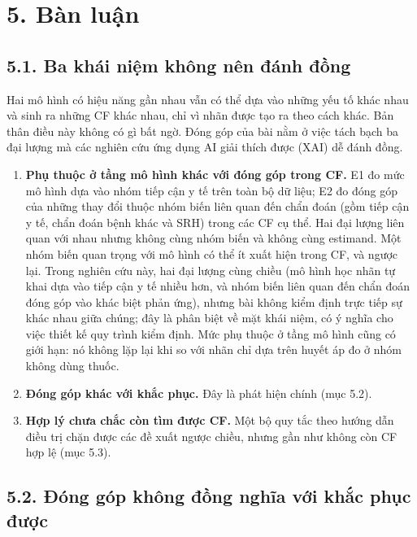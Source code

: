 \documentclass[9pt,a4paper]{extarticle}
\providecommand{\tightlist}{\setlength{\itemsep}{0pt}\setlength{\parskip}{0pt}}
\begin{document}
\section{5. Bàn luận}

\subsection{5.1. Ba khái niệm không nên đánh đồng}

Hai mô hình có hiệu năng gần nhau vẫn có thể dựa vào những yếu tố khác
nhau và sinh ra những CF khác nhau, chỉ vì nhãn được tạo ra theo cách
khác. Bản thân điều này không có gì bất ngờ. Đóng góp của bài nằm ở việc
tách bạch ba đại lượng mà các nghiên cứu ứng dụng AI giải thích được
(XAI) dễ đánh đồng.

\begin{enumerate}
\def\labelenumi{\arabic{enumi}.}
\tightlist
\item
  \textbf{Phụ thuộc ở tầng mô hình khác với đóng góp trong CF.} E1 đo
  mức mô hình dựa vào nhóm tiếp cận y tế trên toàn bộ dữ liệu; E2 đo
  đóng góp của những thay đổi thuộc nhóm biến liên quan đến chẩn đoán
  (gồm tiếp cận y tế, chẩn đoán bệnh khác và SRH) trong các CF cụ thể.
  Hai đại lượng liên quan với nhau nhưng không cùng nhóm biến và không
  cùng estimand. Một nhóm biến quan trọng với mô hình có thể ít xuất
  hiện trong CF, và ngược lại. Trong nghiên cứu này, hai đại lượng cùng
  chiều (mô hình học nhãn tự khai dựa vào tiếp cận y tế nhiều hơn, và
  nhóm biến liên quan đến chẩn đoán đóng góp vào khác biệt phản ứng),
  nhưng bài không kiểm định trực tiếp sự khác nhau giữa chúng; đây là
  phân biệt về mặt khái niệm, có ý nghĩa cho việc thiết kế quy trình
  kiểm định. Mức phụ thuộc ở tầng mô hình cũng có giới hạn: nó không lặp
  lại khi so với nhãn chỉ dựa trên huyết áp đo ở nhóm không dùng thuốc.
\item
  \textbf{Đóng góp khác với khắc phục.} Đây là phát hiện chính (mục
  5.2).
\item
  \textbf{Hợp lý chưa chắc còn tìm được CF.} Một bộ quy tắc theo hướng
  dẫn điều trị chặn được các đề xuất ngược chiều, nhưng gần như không
  còn CF hợp lệ (mục 5.3).
\end{enumerate}

\subsection{5.2. Đóng góp không đồng nghĩa với khắc phục được}
\end{document}
